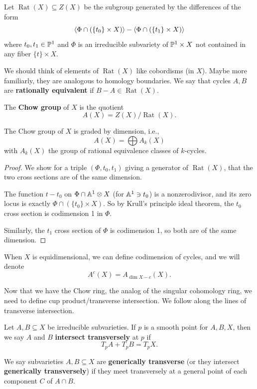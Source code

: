 \documentclass[12pt]{article}
\DeclareMathOperator{\Rat}{Rat}
\begin{document}
\begin{defn}
    Let $\Rat(X)\subseteq Z(X)$ be the subgroup generated by the differences of the form
    \[\<\Phi \cap (\{t_0\}\times X)\> - \<\Phi \cap (\{t_1\}\times X)\>\]
    where $t_0,t_1\in \P^1$ and $\Phi$ is an irreducible subvariety of $\P^1\times X$ not contained in any fiber $\{t\}\times X$.

    We should think of elements of $\Rat(X)$ like cobordisms (in $X$). Maybe more familiarly, they are analogous to homology boundaries. We say that cycles $A,B$ are \textbf{rationally equivalent} if $B-A\in \Rat(X)$.
\end{defn}

\begin{defn}
    The \textbf{Chow group} of $X$ is the quotient
    \[A(X) = Z(X)/\Rat(X).\]
\end{defn}

\begin{prop}
    The Chow group of $X$ is graded by dimension, i.e.,
    \[A(X) = \bigoplus A_k(X)\]
    with $A_k(X)$ the group of rational equivalence classes of $k$-cycles.
\end{prop}

\begin{proof}
    We show for a triple $(\Phi,t_0,t_1)$ giving a generator of $\Rat(X)$, that the two cross sections are of the same dimension.

    The function $t-t_0$ on $\Phi \cap \A^1\otimes X$ (for $\A^1 \ni t_0$) is a nonzerodivisor, and its zero locus is exactly $\Phi \cap (\{t_0\}\times X)$. So by Krull's principle ideal theorem, the $t_0$ cross section is codimension 1 in $\Phi$.

    Similarly, the $t_1$ cross section of $\Phi$ is codimension 1, so both are of the same dimension.
\end{proof}

\begin{rmk}
    When $X$ is equidimensional, we can define codimension of cycles, and we will denote
    \[A^c(X) = A_{\dim X - c}(X).\]
\end{rmk}

Now that we have the Chow ring, the analog of the singular cohomology ring, we need to define cup product/transverse intersection. We follow along the lines of transverse intersection.

\begin{defn}
    Let $A,B\subseteq X$ be irreducible subvarieties. If $p$ is a smooth point for $A,B,X$, then we say $A$ and $B$ \textbf{intersect transversely} at $p$ if
    \[T_p A + T_p B = T_p X.\]

    We say subvarieties $A,B\subseteq X$ are \textbf{generically transverse} (or they intersect \textbf{generically transversely}) if they meet transversely at a general point of each component $C$ of $A\cap B$.
\end{defn}
\end{document}
